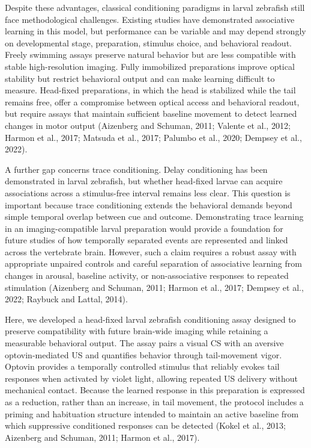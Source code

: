 Despite these advantages, classical conditioning paradigms in larval zebrafish still face methodological challenges. Existing studies have demonstrated associative learning in this model, but performance can be variable and may depend strongly on developmental stage, preparation, stimulus choice, and behavioral readout. Freely swimming assays preserve natural behavior but are less compatible with stable high-resolution imaging. Fully immobilized preparations improve optical stability but restrict behavioral output and can make learning difficult to measure. Head-fixed preparations, in which the head is stabilized while the tail remains free, offer a compromise between optical access and behavioral readout, but require assays that maintain sufficient baseline movement to detect learned changes in motor output (Aizenberg and Schuman, 2011; Valente et al., 2012; Harmon et al., 2017; Matsuda et al., 2017; Palumbo et al., 2020; Dempsey et al., 2022).

A further gap concerns trace conditioning. Delay conditioning has been demonstrated in larval zebrafish, but whether head-fixed larvae can acquire associations across a stimulus-free interval remains less clear. This question is important because trace conditioning extends the behavioral demands beyond simple temporal overlap between cue and outcome. Demonstrating trace learning in an imaging-compatible larval preparation would provide a foundation for future studies of how temporally separated events are represented and linked across the vertebrate brain. However, such a claim requires a robust assay with appropriate unpaired controls and careful separation of associative learning from changes in arousal, baseline activity, or non-associative responses to repeated stimulation (Aizenberg and Schuman, 2011; Harmon et al., 2017; Dempsey et al., 2022; Raybuck and Lattal, 2014).

Here, we developed a head-fixed larval zebrafish conditioning assay designed to preserve compatibility with future brain-wide imaging while retaining a measurable behavioral output. The assay pairs a visual CS with an aversive optovin-mediated US and quantifies behavior through tail-movement vigor. Optovin provides a temporally controlled stimulus that reliably evokes tail responses when activated by violet light, allowing repeated US delivery without mechanical contact. Because the learned response in this preparation is expressed as a reduction, rather than an increase, in tail movement, the protocol includes a priming and habituation structure intended to maintain an active baseline from which suppressive conditioned responses can be detected (Kokel et al., 2013; Aizenberg and Schuman, 2011; Harmon et al., 2017).

